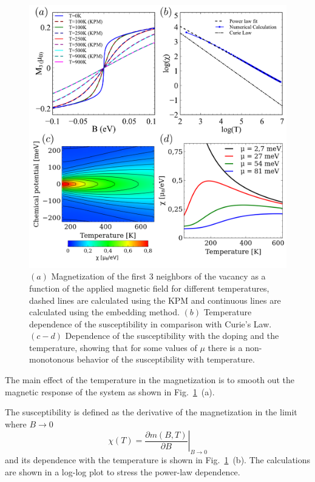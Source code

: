 \begin{figure}[h!]
\centering
\includegraphics{chapter05/figures/temp_sus.pdf}
\vspace{-5pt}
\caption{$(a)$ Magnetization of the first 3 neighbors of the vacancy as a function of the applied magnetic field for different temperatures, dashed lines are calculated using the KPM and continuous lines are calculated using the embedding method.
$(b)$ Temperature dependence of the susceptibility in comparison with Curie’s Law. $(c-d)$ Dependence of the susceptibility with the doping and the temperature, showing that for some values of $\mu$ there is a non-monotonous behavior of the susceptibility with temperature.}
\label{temperature}
\end{figure}
\FloatBarrier
The main effect of the temperature in the magnetization is to smooth out the magnetic response of the system as shown in Fig.~\ref{temperature}~(a).

The susceptibility is defined as the derivative of the magnetization in the limit where $B\rightarrow0$
\begin{equation}
  \chi(T) = \left.\frac{\partial m(B,T)}{\partial B}\right|_{B\rightarrow0}
\end{equation}
and its dependence with the temperature is shown in Fig.~\ref{temperature}~(b).
The calculations are shown in a log-log plot to stress the power-law dependence.

